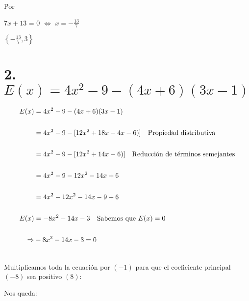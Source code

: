 \documentclass[12pt]{article}
\begin{document}
Por {}

\begin{center}
   
  $7x+13$ = $0$ $\Leftrightarrow$ $ x= -\frac{13}{7}$ 
   
\end{center}

{}

\begin{center}
   
  $\left\{-\frac{13}{7},3\right\}$ 
   
\end{center}

\newpage

\section*{2. $E(x) = 4x^{2} - 9 - (4x+6)(3x-1)$}

{}

\begin{equation*}
    \begin{split}
      E(x) & = 4x^{2} - 9 - (4x+6)(3x-1) \quad\\\\ 
      & = 4x^{2} - 9 - [12x^{2}+18x-4x-6)] \quad \textup{Propiedad distributiva}\\\\
      & =  4x^{2} - 9 - [12x^{2}+14x-6)] \quad \textup{Reducción de términos semejantes}\\\\
      & = 4x^{2} - 9 - 12x^{2}-14x+6\\\\
      & = 4x^{2} - 12x^{2} - 14x-9+6\\\\
      E(x) & =-8x^{2}-14x-3 \quad \textup{Sabemos que $E(x)= 0$} \\\\
      \Rightarrow & -8x^{2}-14x-3 = 0 \quad \\\\
    \end{split}
\end{equation*}

Multiplicamos toda la ecuación por $(-1)$ para que el coeficiente principal $(-8)$ sea positivo $(8)$:\\
\begin{center}
    Nos queda:
\end{center}
\end{document}
